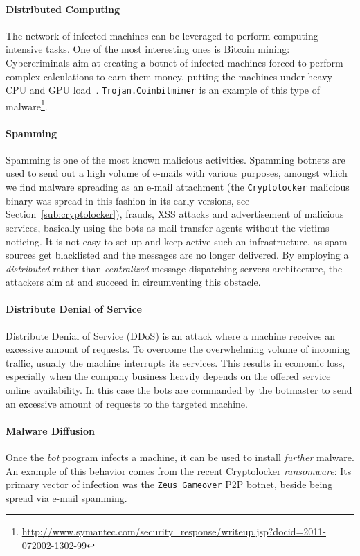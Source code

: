 \paragraph{Distributed Computing} The network of infected machines can be
leveraged to perform computing-intensive tasks. One of the most interesting
ones is Bitcoin mining: Cybercriminals aim at creating a botnet of infected machines forced to perform complex calculations to earn them money, putting the
machines under heavy CPU and GPU load~\cite{spagnuolo2013}.
\texttt{Trojan.Coinbitminer} is an example of this type of
malware\footnote{\url{http://www.symantec.com/security_response/writeup.jsp?docid=2011-072002-1302-99}}.

\paragraph{Spamming} Spamming is one of the most known malicious activities.
Spamming botnets are used to send out a high volume of e-mails with various purposes, amongst which
we find malware spreading as an e-mail attachment (the \texttt{Cryptolocker} malicious binary was spread in this
fashion in its early versions, see Section~\ref{sub:cryptolocker}), frauds, XSS attacks and
advertisement of malicious services, basically using the bots as mail transfer agents without the victims noticing. It is not easy to set up and keep active
such an infrastructure, as spam sources get blacklisted and the messages are no
longer delivered. By employing a \emph{distributed} rather than \emph{centralized}
message dispatching servers architecture, the attackers aim at and succeed in
circumventing this obstacle.

\paragraph{Distribute Denial of Service} Distribute Denial of Service (DDoS)
is an attack where a machine receives an excessive amount of requests. To overcome
the overwhelming volume of incoming traffic, usually the machine interrupts its
services. This results in economic loss, especially when the company business
heavily depends on the offered service online availability. In this case the bots
are commanded by the botmaster to send an excessive amount of requests to the
targeted machine.

\paragraph{Malware Diffusion} Once the \emph{bot} program infects a machine,
it can be used to install \emph{further} malware. An example of this behavior
comes from the recent Cryptolocker \emph{ransomware}: Its primary vector of
infection was the \texttt{Zeus Gameover} P2P botnet, beside being spread via
e-mail spamming.

